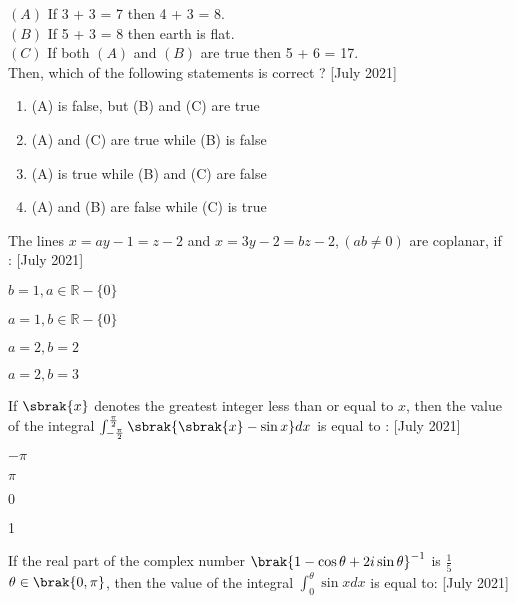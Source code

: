     $(A)$ If 3 + 3 = 7 then 4 + 3 = 8. \\ 
    $(B)$ If 5 + 3 = 8 then earth is flat.\\
    $(C)$ If both $(A)$ and $(B)$ are true then 5 + 6 = 17.\\
    Then, which of the following statements is correct ? \hfill[July 2021]
    \begin{enumerate}
        \item (A) is false, but (B) and (C) are true 
        \item (A) and (C) are true while (B) is false
        \item (A) is true while (B) and (C) are false 
        \item (A) and (B) are false while (C) is true
    \end{enumerate}
    \item The lines $x = ay -1 = z 
- 2$ and $x = 3y -
 2 = bz -
 2, (ab \neq  
 0) $ are coplanar, if \\: 
   \hfill[July 2021]
 \begin{enumerate}
 \begin{multicols}{2}
     \item $b = 1 , a \in \mathbb{R} - \{ 0 \}$
     \item $a = 1 , b \in \mathbb{R} - \{ 0 \}$
     \item $a = 2, b = 2 $
     \item $ a =2 , b = 3$
 \end{multicols}
 \end{enumerate}
   \item  If $\sbrak{x}$ denotes the greatest integer less than or equal to $x$, then the value of the integral $\int_{-\frac{\pi}{2}}^{\frac{\pi}{2}} \sbrak{\sbrak{x} - \sin{x}}dx$ is equal to : \hfill[July 2021]
    \begin{enumerate}
    \begin{multicols}{2}
        \item $-\pi$
        \item $\pi$
        \item $0$
        \item 1
    \end{multicols}
    \end{enumerate}
    \item  If the real part of the complex number $\brak{1 - \cos \theta + 2i \sin\theta}^{-1}$
  is $\frac{1}{5}$ $ \theta \in \brak{0 , \pi}$, then the value of the integral $\int_{0}^{\theta} \sin xdx$ is equal to: \hfill[July 2021]
